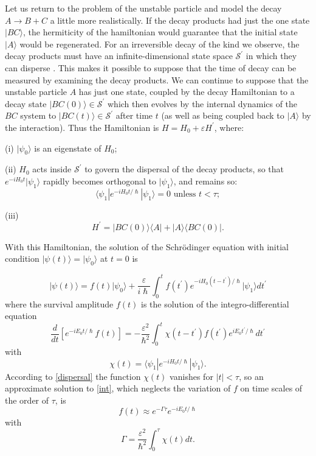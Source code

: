 \documentclass[12pt,a4paper,reqno]{article}
\newcommand{\upline}{\vspace{-\abovedisplayskip}\vspace{-\baselineskip}}
\renewcommand{\(}{\left(}
\renewcommand{\)}{\right)}
\renewcommand{\hbar}{\hslash}
\renewcommand{\S}{\mathcal{S}}
\newcommand{\<}{\langle}
\renewcommand{\>}{\rangle}
\theoremstyle{plain} %
\theoremstyle{definition}
\theoremstyle{remark}
\begin{document}
 Let us return to the problem of the unstable particle and model the
decay  $A\rightarrow B+C$ a little more realistically. If the decay
products  had just the one state $|BC\>$, the hermiticity of the
hamiltonian  would guarantee that the initial state $|A\>$ would be
regenerated.  For an irreversible decay of the kind we observe, the
decay products  must have an infinite-dimensional state space
$\S^\prime$ in which they can disperse \cite{rapid-dispersal}. This
makes it possible to suppose that the time of decay can be measured by
examining the decay products.  We can continue to suppose that the
unstable particle $A$ has just one  state, coupled by the decay
Hamiltonian to a decay state $|BC(0)\>\in \S^\prime$  which then evolves
by the internal dynamics of the $BC$ system to $|BC(t)\>\in \S^\prime$
after time $t$ (as well as being coupled back to $|A\>$ by the 
interaction). Thus the Hamiltonian is $H = H_0 + \varepsilon H^\prime$,
where:

\vspace{0.5\baselineskip}
\noindent (i) $|\psi_0\>$ is an eigenstate of $H_0$;
\vspace{0.5\baselineskip}

\noindent (ii) $H_0$ acts inside $\S^\prime$ to govern the dispersal of
the decay products, so that $e^{-iH_0t}|\psi_1\>$ rapidly becomes
orthogonal to $|\psi_1\>$, and remains so:
\begin{equation}\label{dispersal} 
\<\psi_1|e^{-iH_0t/\hbar}|\psi_1\> = 0 \text{  unless  } t < \tau;
\end{equation}

\noindent (iii)
\upline
\[ 
H^\prime = |BC(0)\>\<A| + |A\>\<BC(0)|.
\]

With this Hamiltonian, the solution of the Schr\"odinger equation with
initial condition $|\psi(t)\> = |\psi_0\>$ at $t=0$ is \cite{obsdecay}

\begin{equation}\label{decay2}
|\psi(t)\> = f(t)|\psi_0\> + \frac{\varepsilon}{i\hbar}\int_0^t
f(t^\prime)e^{-iH_0(t-t^\prime)/\hbar}|\psi_1\>dt^\prime
\end{equation}
where the survival amplitude $f(t)$ is the solution of the
integro-differential equation
\begin{equation}\label{int}
\frac{d}{dt}\left[e^{-iE_0t/\hbar}f(t)\right] =
-\frac{\varepsilon^2}{\hbar^2}
\int_0^t\chi(t-t^\prime)f(t^\prime)e^{iE_0t^\prime/\hbar}dt^\prime 
\end{equation}
with\upline
\[
\chi(t) = \<\psi_1|e^{-iH_0t/\hbar}|\psi_1\>.
\]
According to \eqref{dispersal} the function $\chi(t)$ vanishes for
$|t|<\tau$, so an approximate solution to \eqref{int}, which neglects
the variation of $f$ on time scales of the order of $\tau$, is
\[
f(t) \approx e^{-\Gamma\tau}e^{-iE_0t/\hbar}
\]
with \upline
\[
\Gamma = \frac{\varepsilon^2}{\hbar^2}\int_0^\tau\chi(t)dt.
\]
\end{document}
